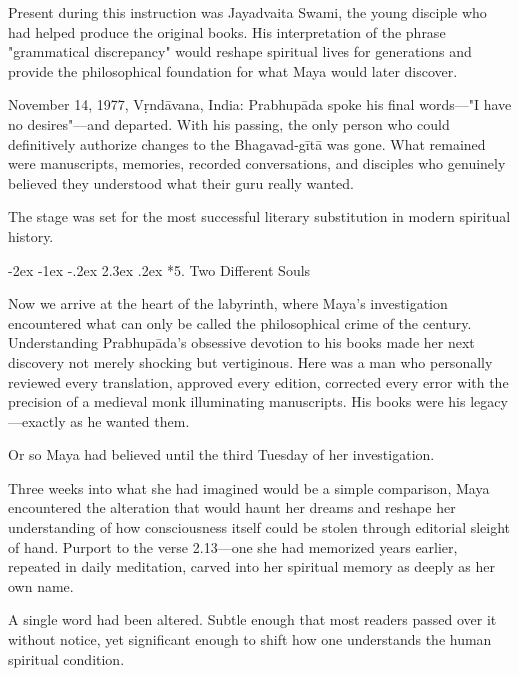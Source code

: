 \documentclass[12pt,twoside]{book}
\makeatletter
\def\cleardoublepage{\clearpage\if@twoside \ifodd\c@page\else\hbox{}\thispagestyle{empty}\newpage\if@twocolumn\hbox{}\newpage\fi\fi\fi}
\renewcommand\section{\@startsection{section}{1}{\z@}%
{-2ex \@plus -1ex \@minus -.2ex}%
{2.3ex \@plus.2ex}%
{\normalfont\Large\bfseries}}
\makeatother
\begin{document}
Present during this instruction was Jayadvaita Swami, the young disciple who had helped produce the original books. His interpretation of the phrase "grammatical discrepancy" would reshape spiritual lives for generations and provide the philosophical foundation for what Maya would later discover.

November 14, 1977, Vṛndāvana, India: Prabhupāda spoke his final words—"I have no desires"—and departed. With his passing, the only person who could definitively authorize changes to the Bhagavad-gītā was gone. What remained were manuscripts, memories, recorded conversations, and disciples who genuinely believed they understood what their guru really wanted.

The stage was set for the most successful literary substitution in modern spiritual history.

\cleardoublepage
\vspace*{0.20\textheight}
\section*{5. Two Different Souls}
\thispagestyle{chapterpage}

\normalfont\justifying
Now we arrive at the heart of the labyrinth, where Maya's investigation encountered what can only be called the philosophical crime of the century. Understanding Prabhupāda's obsessive devotion to his books made her next discovery not merely shocking but vertiginous. Here was a man who personally reviewed every translation, approved every edition, corrected every error with the precision of a medieval monk illuminating manuscripts. His books were his legacy—exactly as he wanted them.

Or so Maya had believed until the third Tuesday of her investigation.

Three weeks into what she had imagined would be a simple comparison, Maya encountered the alteration that would haunt her dreams and reshape her understanding of how consciousness itself could be stolen through editorial sleight of hand. Purport to the verse 2.13—one she had memorized years earlier, repeated in daily meditation, carved into her spiritual memory as deeply as her own name.

A single word had been altered. Subtle enough that most readers passed over it without notice, yet significant enough to shift how one understands the human spiritual condition.
\end{document}
